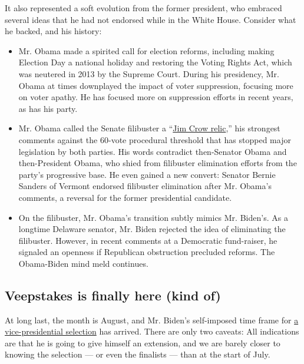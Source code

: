 It also represented a soft evolution from the former president, who
embraced several ideas that he had not endorsed while in the White
House. Consider what he backed, and his history:

\begin{itemize}
\item
  Mr. Obama made a spirited call for election reforms, including making
  Election Day a national holiday and restoring the Voting Rights Act,
  which was neutered in 2013 by the Supreme Court. During his
  presidency, Mr. Obama at times downplayed the impact of voter
  suppression, focusing more on voter apathy. He has focused more on
  suppression efforts in recent years, as has his party.
\item
  Mr. Obama called the Senate filibuster a
  ``\href{https://www.nytimes.com/2020/07/30/us/obama-filibuster-senate-democrats.html}{Jim
  Crow relic},'' his strongest comments against the 60-vote procedural
  threshold that has stopped major legislation by both parties. His
  words contradict then-Senator Obama and then-President Obama, who
  shied from filibuster elimination efforts from the party's progressive
  base. He even gained a new convert: Senator Bernie Sanders of Vermont
  endorsed filibuster elimination after Mr. Obama's comments, a reversal
  for the former presidential candidate.
\item
  On the filibuster, Mr. Obama's transition subtly mimics Mr. Biden's.
  As a longtime Delaware senator, Mr. Biden rejected the idea of
  eliminating the filibuster. However, in recent comments at a
  Democratic fund-raiser, he signaled an openness if Republican
  obstruction precluded reforms. The Obama-Biden mind meld continues.
\end{itemize}

\hypertarget{veepstakes-is-finally-here-kind-of}{%
\subsection{Veepstakes is finally here (kind
of)}\label{veepstakes-is-finally-here-kind-of}}

At long last, the month is August, and Mr. Biden's self-imposed time
frame for
\href{https://www.nytimes.com/article/biden-vice-president-2020.html}{a
vice-presidential selection} has arrived. There are only two caveats:
All indications are that he is going to give himself an extension, and
we are barely closer to knowing the selection --- or even the finalists
--- than at the start of July.

